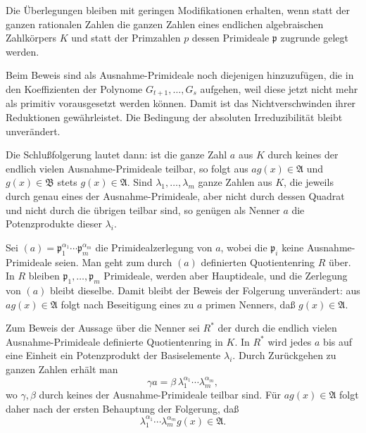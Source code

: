 \documentclass[11pt]{article}
\providecommand{\frakA}{\mathfrak A}
\providecommand{\frakB}{\mathfrak B}
\providecommand{\frakp}{\mathfrak p}
\begin{document}
Die Überlegungen bleiben mit geringen Modifikationen erhalten, wenn statt der ganzen rationalen Zahlen die ganzen Zahlen eines endlichen algebraischen Zahlkörpers \(K\) und statt der Primzahlen \(p\) dessen Primideale \(\frakp\) zugrunde gelegt werden.

Beim Beweis sind als Ausnahme-Primideale noch diejenigen hinzuzufügen, die in den Koeffizienten der Polynome \(G_{t+1},\ldots,G_s\) aufgehen, weil diese jetzt nicht mehr als primitiv vorausgesetzt werden können. Damit ist das Nichtverschwinden ihrer Reduktionen gewährleistet. Die Bedingung der absoluten Irreduzibilität bleibt unverändert.

Die Schlußfolgerung lautet dann: ist die ganze Zahl \(a\) aus \(K\) durch keines der endlich vielen Ausnahme-Primideale teilbar, so folgt aus \(a g(x)\in\frakA\) und \(g(x)\in\frakB\) stets \(g(x)\in\frakA\). Sind \(\lambda_1,\ldots,\lambda_m\) ganze Zahlen aus \(K\), die jeweils durch genau eines der Ausnahme-Primideale, aber nicht durch dessen Quadrat und nicht durch die übrigen teilbar sind, so genügen als Nenner \(a\) die Potenzprodukte dieser \(\lambda_i\).

Sei \((a)=\frakp_1^{\alpha_1}\cdots\frakp_m^{\alpha_m}\) die Primidealzerlegung von \(a\), wobei die \(\frakp_i\) keine Ausnahme-Primideale seien. Man geht zum durch \((a)\) definierten Quotientenring \(R\) über. In \(R\) bleiben \(\frakp_1,\ldots,\frakp_m\) Primideale, werden aber Hauptideale, und die Zerlegung von \((a)\) bleibt dieselbe. Damit bleibt der Beweis der Folgerung unverändert: aus \(a g(x)\in\frakA\) folgt nach Beseitigung eines zu \(a\) primen Nenners, daß \(g(x)\in\frakA\).

Zum Beweis der Aussage über die Nenner sei \(R^*\) der durch die endlich vielen Ausnahme-Primideale definierte Quotientenring in \(K\). In \(R^*\) wird jedes \(a\) bis auf eine Einheit ein Potenzprodukt der Basiselemente \(\lambda_i\). Durch Zurückgehen zu ganzen Zahlen erhält man
\[
        \gamma a=\beta\,\lambda_1^{\alpha_1}\cdots\lambda_m^{\alpha_m},
\]
wo \(\gamma,\beta\) durch keines der Ausnahme-Primideale teilbar sind. Für \(a g(x)\in\frakA\) folgt daher nach der ersten Behauptung der Folgerung, daß
\[
        \lambda_1^{\alpha_1}\cdots\lambda_m^{\alpha_m}g(x)\in\frakA.
\]
\end{document}
